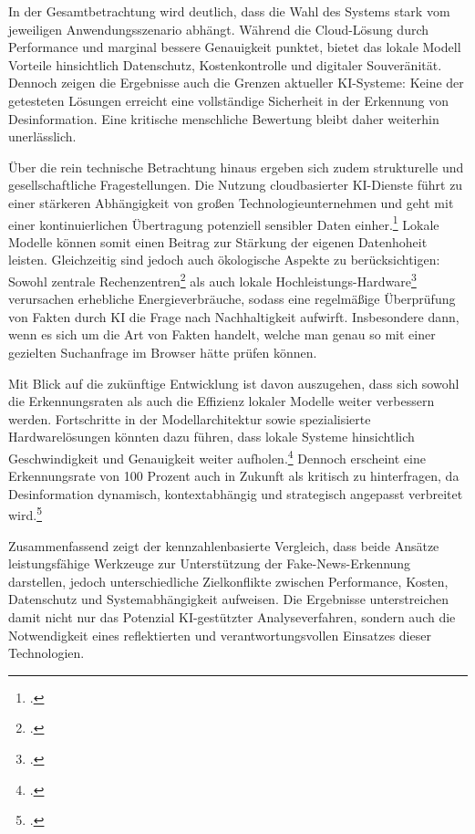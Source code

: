 \documentclass[12pt,a4paper]{article}
\begin{document}
    In der Gesamtbetrachtung wird deutlich, dass die Wahl des
    Systems stark vom jeweiligen Anwendungsszenario abhängt. Während die Cloud-Lösung
    durch Performance und marginal bessere Genauigkeit punktet, bietet das lokale
    Modell Vorteile hinsichtlich Datenschutz, Kostenkontrolle und digitaler
    Souveränität. Dennoch zeigen die Ergebnisse auch die Grenzen aktueller
    KI-Systeme: Keine der getesteten Lösungen erreicht eine
    vollständige Sicherheit in der Erkennung von Desinformation. Eine kritische
    menschliche Bewertung bleibt daher weiterhin unerlässlich.

    Über die rein technische Betrachtung hinaus ergeben sich
    zudem strukturelle und gesellschaftliche Fragestellungen. Die Nutzung
    cloudbasierter KI-Dienste führt zu einer stärkeren Abhängigkeit von großen
    Technologieunternehmen und geht mit einer kontinuierlichen Übertragung
    potenziell sensibler Daten einher.\footcite{IndustrJohannSell} Lokale Modelle können somit einen Beitrag zur
    Stärkung der eigenen Datenhoheit leisten. Gleichzeitig sind jedoch auch ökologische
    Aspekte zu berücksichtigen: Sowohl zentrale Rechenzentren\footcite{OekoEnergieRechenzentren} als auch lokale
    Hochleistungs-Hardware\footcite{HeiseEnergieLokal} verursachen erhebliche Energieverbräuche, sodass
    eine regelmäßige Überprüfung von Fakten durch KI die Frage nach Nachhaltigkeit
    aufwirft. Insbesondere dann, wenn es sich um die Art von Fakten handelt, welche
    man genau so mit einer gezielten Suchanfrage im Browser hätte prüfen können.

    Mit Blick auf die zukünftige Entwicklung ist davon
    auszugehen, dass sich sowohl die Erkennungsraten als auch die Effizienz lokaler
    Modelle weiter verbessern werden. Fortschritte in der Modellarchitektur sowie spezialisierte
    Hardwarelösungen könnten dazu führen, dass lokale Systeme hinsichtlich Geschwindigkeit und Genauigkeit
    weiter aufholen.\footcite{HeiseEnergieLokal} Dennoch erscheint eine Erkennungsrate von 100 Prozent auch
    in Zukunft als kritisch zu hinterfragen, da Desinformation dynamisch, kontextabhängig
    und strategisch angepasst verbreitet wird.\footcite{BMBFFakeNews}

    Zusammenfassend zeigt der kennzahlenbasierte Vergleich,
    dass beide Ansätze leistungsfähige Werkzeuge zur Unterstützung der
    Fake-News-Erkennung darstellen, jedoch unterschiedliche Zielkonflikte zwischen
    Performance, Kosten, Datenschutz und Systemabhängigkeit aufweisen. Die
    Ergebnisse unterstreichen damit nicht nur das Potenzial KI-gestützter
    Analyseverfahren, sondern auch die Notwendigkeit eines reflektierten und
    verantwortungsvollen Einsatzes dieser Technologien.

    \newpage

    \setcounter{page}{3} %

    \printbibliography
\end{document}
